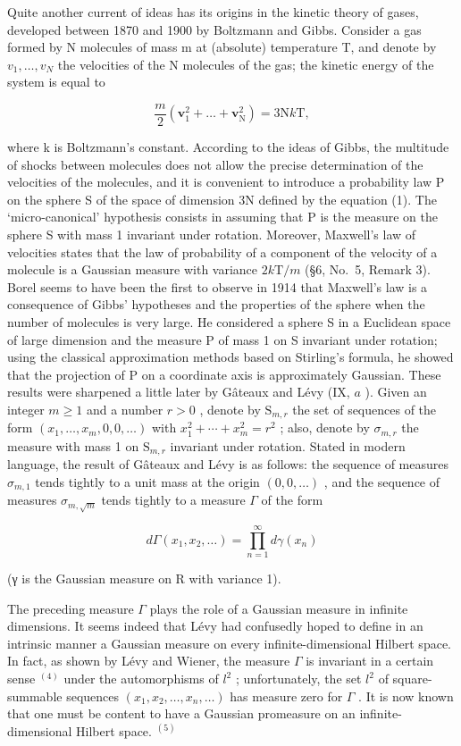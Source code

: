Quite another current of ideas has its origins in the kinetic theory of gases, developed between 1870 and 1900 by Boltzmann and Gibbs. Consider a gas formed by N molecules of mass m at (absolute) temperature T, and denote by \(v_{1},\ldots,v_{N}\) the velocities of the N molecules of the gas; the kinetic energy of the system is equal to

\[
\frac {m}{2} (\mathbf {v} _ {1} ^ {2} + \dots + \mathbf {v} _ {\mathrm{N}} ^ {2}) = 3 \mathrm{N} k \mathrm{T},\tag{1}
\]

where k is Boltzmann's constant. According to the ideas of Gibbs, the multitude of shocks between molecules does not allow the precise determination of the velocities of the molecules, and it is convenient to introduce a probability law P on the sphere S of the space of dimension 3N defined by the equation (1). The `micro-canonical' hypothesis consists in assuming that P is the measure on the sphere S with mass 1 invariant under rotation. Moreover, Maxwell's law of velocities states that the law of probability of a component of the velocity of a molecule is a Gaussian measure with variance \(2k\mathrm{T} / m\) (§6, No.~5, Remark 3). Borel seems to have been the first to observe in 1914 that Maxwell's law is a consequence of Gibbs' hypotheses and the properties of the sphere when the number of molecules is very large. He considered a sphere S in a Euclidean space of large dimension and the measure P of mass 1 on S invariant under rotation; using the classical approximation methods based on Stirling's formula, he showed that the projection of P on a coordinate axis is approximately Gaussian. These results were sharpened a little later by Gâteaux and Lévy (IX, \(a\) ). Given an integer \(m \geqslant 1\) and a number \(r > 0\) , denote by \(\mathrm{S}_{m,r}\) the set of sequences of the form \((x_{1}, \ldots, x_{m}, 0, 0, \ldots)\) with \(x_{1}^{2} + \cdots + x_{m}^{2} = r^{2}\) ; also, denote by \(\sigma_{m,r}\) the measure with mass 1 on \(\mathrm{S}_{m,r}\) invariant under rotation. Stated in modern language, the result of Gâteaux and Lévy is as follows: the sequence of measures \(\sigma_{m,1}\) tends tightly to a unit mass at the origin \((0, 0, \ldots)\) , and the sequence of measures \(\sigma_{m,\sqrt{m}}\) tends tightly to a measure \(\Gamma\) of the form

\[
d \Gamma (x _ {1}, x _ {2}, \dots) = \prod_ {n = 1} ^ {\infty} d \gamma (x _ {n})
\]

(γ is the Gaussian measure on R with variance 1).

The preceding measure \(\Gamma\) plays the role of a Gaussian measure in infinite dimensions. It seems indeed that Lévy had confusedly hoped to define in an intrinsic manner a Gaussian measure on every infinite-dimensional Hilbert space. In fact, as shown by Lévy and Wiener, the measure \(\Gamma\) is invariant in a certain sense \(^{(4)}\) under the automorphisms of \(l^{2}\) ; unfortunately, the set \(l^{2}\) of square-summable sequences \((x_{1}, x_{2}, \ldots, x_{n}, \ldots)\) has measure zero for \(\Gamma\) . It is now known that one must be content to have a Gaussian promeasure on an infinite-dimensional Hilbert space. \(^{(5)}\)

